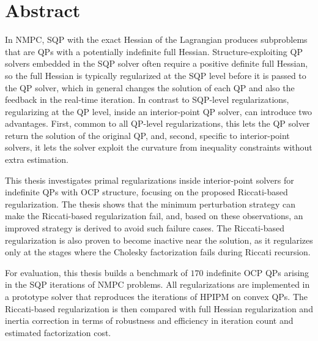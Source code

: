 \documentclass[class=scrbook, crop=false]{standalone}
\begin{document}
\chapter*{Abstract}
\label{Chapter::Abstract}
{

    \setlength{\parskip}{1em}
    \setlength{\parindent}{0em}

    In \gls{NMPC}, \gls{SQP} with the exact Hessian of the Lagrangian
    produces subproblems that are \glspl{QP} with a potentially indefinite full Hessian.
    Structure-exploiting \gls{QP} solvers embedded in the \gls{SQP} solver often require a positive definite full Hessian,
    so the full Hessian is typically regularized at the \gls{SQP} level before it is passed to the \gls{QP} solver,
    which in general changes the solution of each \gls{QP} and also the feedback in the real-time iteration.
    In contrast to SQP-level regularizations,
    regularizing at the \gls{QP} level, inside an interior-point \gls{QP} solver, can introduce two advantages.
    First, common to all \gls{QP}-level regularizations, 
    this lets the \gls{QP} solver return the solution of the original QP,
    and, second, specific to interior-point solvers,
    it lets the solver exploit the curvature from inequality constraints without extra estimation.

    This thesis investigates primal regularizations inside interior-point solvers 
    for indefinite \glspl{QP} with \gls{OCP} structure, focusing on the proposed Riccati-based regularization.
    The thesis shows that the minimum perturbation strategy can make the Riccati-based regularization fail, 
    and, based on these observations, an improved strategy is derived to avoid such failure cases.
    The Riccati-based regularization is also proven to become inactive near the solution,
    as it regularizes only at the stages where the Cholesky factorization fails during Riccati recursion.

    For evaluation, this thesis builds a benchmark of $170$ indefinite \gls{OCP} \glspl{QP} 
    arising in the \gls{SQP} iterations of \gls{NMPC} problems.
    All regularizations are implemented in a prototype solver that reproduces the iterations of HPIPM on convex \glspl{QP}.
    The Riccati-based regularization is then compared with full Hessian regularization and inertia correction
    in terms of robustness and efficiency in iteration count and estimated factorization cost.
}
\end{document}
